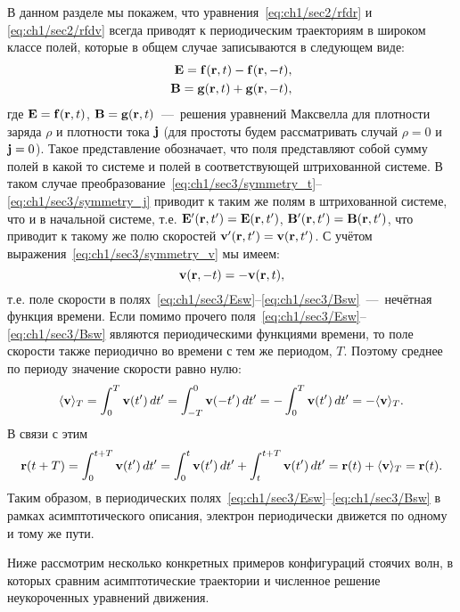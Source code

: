 В данном разделе мы покажем, что уравнения~\eqref{eq:ch1/sec2/rfdr} и \eqref{eq:ch1/sec2/rfdv} всегда приводят к периодическим траекториям в широком классе полей, которые в общем случае записываются в следующем виде:
\begin{eqnarray}
    \label{eq:ch1/sec3/Esw}
    \vb{E} = \vb{f}(\vb{r}, t) - \vb{f}(\vb{r}, -t), \\
    \label{eq:ch1/sec3/Bsw}
    \vb{B} = \vb{g}(\vb{r}, t) + \vb{g}(\vb{r}, -t),
\end{eqnarray}
где $\vb{E = f}(\vb{r}, t)$, $\vb{B = g}(\vb{r}, t)$~---~решения уравнений Максвелла для плотности заряда $\rho$ и плотности тока $\vb{j}$ (для простоты будем рассматривать случай $\rho = 0$ и $\vb{j} = 0$). 
Такое представление обозначает, что поля представляют собой сумму полей в какой то системе и полей в соответствующей штрихованной системе. В таком случае преобразование~\eqref{eq:ch1/sec3/symmetry_t}--\eqref{eq:ch1/sec3/symmetry_j} приводит к таким же полям в штрихованной системе, что и в начальной системе, т.е. $\vb{E}'(\vb{r}, t') = \vb{E}(\vb{r}, t')$, $\vb{B}'(\vb{r}, t')
= \vb{B}(\vb{r}, t')$, что приводит к такому же полю скоростей $\vb{v}'(\vb{r}, t') = \vb{v}(\vb{r}, t')$. С учётом выражения~\eqref{eq:ch1/sec3/symmetry_v} мы имеем:
\begin{equation}
    \vb{v}(\vb{r}, -t) = -\vb{v}(\vb{r}, t),
\end{equation}
т.е. поле скорости в полях~\eqref{eq:ch1/sec3/Esw}--\eqref{eq:ch1/sec3/Bsw}~---~нечётная функция времени. Если помимо прочего поля~\eqref{eq:ch1/sec3/Esw}--\eqref{eq:ch1/sec3/Bsw} являются периодическими функциями времени, то поле скорости также периодично во времени с тем же периодом, $T$. Поэтому среднее по периоду значение скорости равно нулю:
\begin{equation}
    \langle\vb{v}\rangle_T=\int_0^{T} \vb{v}(t')\,dt'=\int_{-T}^{0}\vb{v}(-t')\,dt'=-\int_{0}^{T}\vb{v}(t')\,dt'=-\langle\vb{v}\rangle_T.
\end{equation}
В связи с этим
\begin{equation}
    \vb{r}(t+T)=\int_0^{t+T} \vb{v}(t')\,dt'=\int_0^t \vb{v}(t')\,dt'+\int_t^{t+T} \vb{v}(t')\,dt'=\vb{r}(t)+\langle\vb{v}\rangle_T=\vb{r}(t).
\end{equation}
Таким образом, в периодических полях~\eqref{eq:ch1/sec3/Esw}--\eqref{eq:ch1/sec3/Bsw} в рамках асимптотического описания, электрон периодически движется по одному и тому же пути.

Ниже рассмотрим несколько конкретных примеров конфигураций стоячих волн, в которых сравним асимптотические траектории и численное решение неукороченных уравнений движения.

